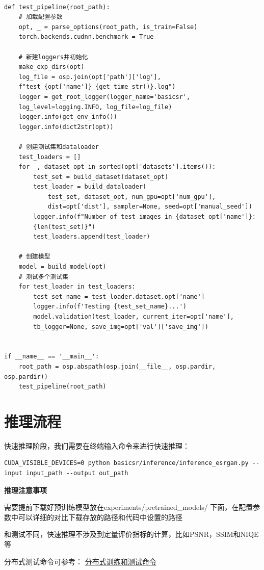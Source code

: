 \documentclass[../main.tex]{subfiles}
\begin{document}
\begin{verbatim}

def test_pipeline(root_path):
    # 加载配置参数
    opt, _ = parse_options(root_path, is_train=False)
    torch.backends.cudnn.benchmark = True

    # 新建loggers并初始化
    make_exp_dirs(opt)
    log_file = osp.join(opt['path']['log'],
    f"test_{opt['name']}_{get_time_str()}.log")
    logger = get_root_logger(logger_name='basicsr',
    log_level=logging.INFO, log_file=log_file)
    logger.info(get_env_info())
    logger.info(dict2str(opt))

    # 创建测试集和dataloader
    test_loaders = []
    for _, dataset_opt in sorted(opt['datasets'].items()):
        test_set = build_dataset(dataset_opt)
        test_loader = build_dataloader(
            test_set, dataset_opt, num_gpu=opt['num_gpu'],
            dist=opt['dist'], sampler=None, seed=opt['manual_seed'])
        logger.info(f"Number of test images in {dataset_opt['name']}:
        {len(test_set)}")
        test_loaders.append(test_loader)

    # 创建模型
    model = build_model(opt)
    # 测试多个测试集
    for test_loader in test_loaders:
        test_set_name = test_loader.dataset.opt['name']
        logger.info(f'Testing {test_set_name}...')
        model.validation(test_loader, current_iter=opt['name'],
        tb_logger=None, save_img=opt['val']['save_img'])


if __name__ == '__main__':
    root_path = osp.abspath(osp.join(__file__, osp.pardir, osp.pardir))
    test_pipeline(root_path)
\end{verbatim}


\section{推理流程}

快速推理阶段，我们需要在终端输入命令来进行快速推理：
\begin{verbatim}
CUDA_VISIBLE_DEVICES=0 python basicsr/inference/inference_esrgan.py --input input_path --output out_path
\end{verbatim}

\begin{hl} %
    
    \textbf{推理注意事项}
    
    需要提前下载好预训练模型放在experiments/pretrained\_models/ 下面，在配置参数中可以详细的对比下载存放的路径和代码中设置的路径
    
    和测试不同，快速推理不涉及到定量评价指标的计算，比如PSNR，SSIM和NIQE等
    
    分布式测试命令可参考：
\href{https://github.com/XPixelGroup/BasicSR/blob/master/docs/TrainTest.md}{分布式训练和测试命令}
    
\end{hl}
\end{document}

